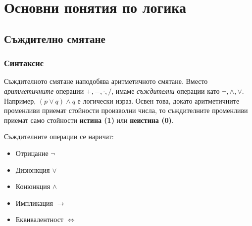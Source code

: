 \chapter{Основни понятия по логика}

\section{Съждително смятане}
\label{sect:propositional}

\subsection{Синтаксис}

Съждителното смятане наподобява аритметичното смятане.
Вместо {\em аритметичните} операции $+,-,\cdot,/$, имаме {\em съждителни} операции като $\neg, \wedge, \vee$.
Например, $(p\vee q) \land q$ е логически израз.
Освен това, докато аритметичните променливи приемат стойности произволни числа, то
съждителните променливи приемат само стойности {\bf истина (1)} или {\bf неистина (0)}.

Съждителните операции се наричат:
\begin{itemize}
\item
  Отрицание $\neg$
\item 
  Дизюнкция $\vee$
\item
  Конюнкция $\wedge$
\item
  Импликация $\rightarrow$
\item
  Еквивалентност $\iff$
\end{itemize}

